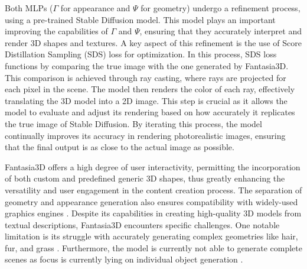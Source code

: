 Both MLPs (\(\Gamma\) for appearance and \(\Psi\) for geometry) undergo a refinement process, using a pre-trained Stable Diffusion model. This model plays an important improving the capabilities of \(\Gamma\) and \(\Psi\), ensuring that they accurately interpret and render 3D shapes and textures. A key aspect of this refinement is the use of Score Distillation Sampling (SDS) loss for optimization. In this process, SDS loss functions by comparing the true image with the one generated by Fantasia3D. This comparison is achieved through ray casting, where rays are projected for each pixel in the scene. The model then renders the color of each ray, effectively translating the 3D model into a 2D image. This step is crucial as it allows the model to evaluate and adjust its rendering based on how accurately it replicates the true image of Stable Diffusion. By iterating this process, the model continually improves its accuracy in rendering photorealistic images, ensuring that the final output is as close to the actual image as possible.

Fantasia3D offers a high degree of user interactivity, permitting the incorporation of both custom and predefined generic 3D shapes, thus greatly enhancing the versatility and user engagement in the content creation process. The separation of geometry and appearance generation also ensures compatibility with widely-used graphics engines \citep{chen2023fantasia3d}. Despite its capabilities in creating high-quality 3D models from textual descriptions, Fantasia3D encounters specific challenges. One notable limitation is its struggle with accurately generating complex geometries like hair, fur, and grass \citep{chen2023fantasia3d}. Furthermore, the model is currently not able to generate complete scenes as focus is currently lying on individual object generation \citep{chen2023fantasia3d}.